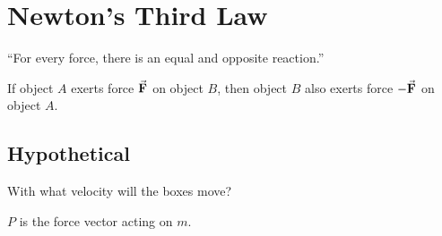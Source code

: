 \documentclass{article}
\begin{document}
\section{Newton's Third Law}
``For every force, there is an equal and opposite reaction.''
\bigskip

\noindent If object $A$ exerts force $\va{F}$ on object $B$, then 
object $B$ also exerts force $-\va{F}$ on object $A$.

\newpage
\subsection{Hypothetical}
With what velocity will the boxes move?
\begin{figure}[h]
    \centering
\end{figure}
$P$ is the force vector acting on $m$.
\end{document}
